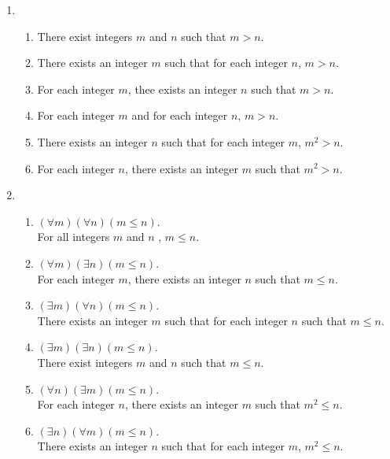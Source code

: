 \begin{enumerate}
\item \begin{enumerate}
\item There exist integers $m$ and $n$ such that $m > n$.
\item There exists an integer $m$ such that for each integer $n$, $m > n$.
\item For each integer $m$, thee exists an integer $n$ such that $m > n$.
\item For each integer $m$ and for each integer $n$, $m > n$.
\item There exists an integer $n$ such that for each integer $m$, $m^2 > n$.
\item For each integer $n$, there exists an integer $m$ such that $m^2 > n$.
\end{enumerate}

\item \begin{enumerate}
\item $\left( \forall m \right) \left( \forall n \right) \left( m \le n \right)$.  \\
For all integers $m$ and $n$ , $m \le n$.

\item $\left( \forall m \right) \left( \exists n \right) \left( m \le n \right)$.  \\
For each integer $m$, there exists an integer $n$ such that $m \le n$.

\item $\left( \exists m \right) \left( \forall n \right) \left( m \le n \right)$.  \\
There exists an integer $m$ such that for each integer $n$ such that $m \le n$.

\item $\left( \exists m \right) \left( \exists n \right) \left( m \le n \right)$.  \\
There exist integers $m$ and $n$ such that $m \le n$.

\item $\left( \forall n \right) \left( \exists m \right) \left( m \le n \right)$.  \\
For each integer $n$, there exists an integer $m$ such that  $m^2 \le n$.

\item $\left( \exists n \right) \left( \forall m \right) \left( m \le n \right)$.  \\
There exists an integer $n$ such that for each integer $m$, $m^2 \le n$.
\end{enumerate}




\end{enumerate}

